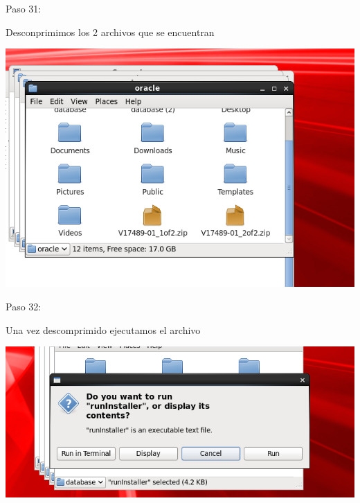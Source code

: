 \begin{itemize}
\begin{center}
    Paso 31:
\end{center}

    Desconprimimos los 2 archivos que se encuentran\\
	\begin{center}
	\includegraphics[width=15cm]{./Imagenes/imagen31} 
	\end{center}

\end{itemize} 


\begin{itemize}
\begin{center}
    Paso 32:
\end{center}

    Una vez descomprimido ejecutamos el archivo\\
	\begin{center}
	\includegraphics[width=15cm]{./Imagenes/imagen32} 
	\end{center}

\end{itemize} 
